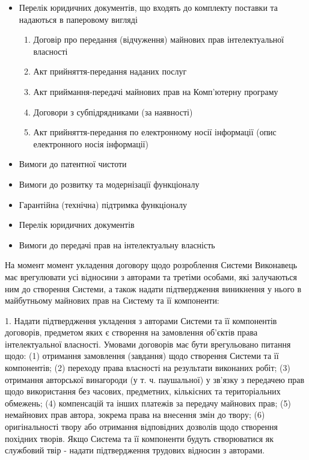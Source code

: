 \documentclass{article}
\begin{document}
  \begin{itemize}
\item Перелік юридичних документів, що входять до комплекту поставки та надаються в паперовому вигляді
  \begin{enumerate}
\item Договір про передання (відчуження) майнових прав інтелектуальної власності
\item Акт прийняття-передання наданих послуг
\item Акт приймання-передачі майнових прав на Комп'ютерну програму
\item Договори з субпідрядниками (за наявності)
\item Акт прийняття-передання по електронному носії інформації (опис електронного носія інформації)
  \end{enumerate}
\item Вимоги до патентної чистоти
\item Вимоги до розвитку та модернізації функціоналу
\item Гарантійна (технічна) підтримка функціоналу
\item Перелік юридичних документів
\item Вимоги до передачі прав на інтелектуальну власність
  \end{itemize}

На момент момент укладення договору щодо розроблення Системи Виконавець має врегулювати усі відносини з авторами та третіми особами, які залучаються ним до створення Системи, а також надати підтвердження виникнення у нього в майбутньому майнових прав на Систему та її компоненти:

1. Надати підтвердження укладення з авторами Системи та її компонентів договорів, предметом яких є створення на замовлення об’єктів права інтелектуальної власності. Умовами договорів має бути врегульовано питання щодо: (1) отримання замовлення (завдання) щодо створення Системи та її компонентів; (2) переходу права власності на результати виконаних робіт; (3) отримання авторської винагороди (у т. ч. паушальної) у зв’язку з передачею прав щодо використання без часових, предметних, кількісних та територіальних обмежень; (4) компенсацій та інших платежів за передачу майнових прав; (5) немайнових прав автора, зокрема права на внесення змін до твору; (6) оригінальності твору або отримання відповідних дозволів щодо створення похідних творів. Якщо Система та її компоненти будуть створюватися як службовий твір - надати підтвердження трудових відносин з авторами. 
\end{document}
